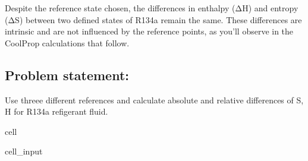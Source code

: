 \documentclass[letterpaper,10pt,english]{jupyterBook}
\begin{document}
\sphinxAtStartPar
Despite the reference state chosen, the differences in enthalpy (ΔH) and entropy (ΔS) between two defined states of R\sphinxhyphen{}134a remain the same. These differences are intrinsic and are not influenced by the reference points, as you’ll observe in the CoolProp calculations that follow.


\subsection{Problem statement:}
\label{\detokenize{notebooks/Chapter4/use_different_references_in_CoolProp:problem-statement}}
\sphinxAtStartPar
Use threee different references and calculate absolute and relative differences of S, H for R134a refigerant fluid.

\begin{sphinxuseclass}{cell}\begin{sphinxVerbatimInput}

\begin{sphinxuseclass}{cell_input}
\begin{sphinxVerbatim}[commandchars=\\\{\}]
\end{sphinxVerbatim}

\end{sphinxuseclass}\end{sphinxVerbatimInput}

\end{sphinxuseclass}
\end{document}
